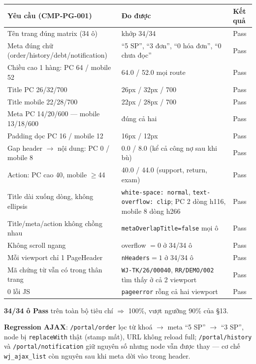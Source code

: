 \begin{longtable}{@{}p{7.4cm}p{4.3cm}p{2.6cm}@{}}
\toprule
\textbf{Yêu cầu (CMP-PG-001)} & \textbf{Đo được} & \textbf{Kết quả} \\
\midrule
\endhead
Tên trang đúng matrix (34 ô) & khớp 34/34 & Pass \\
Meta đúng chữ (order/history/debt/notification) & ``5 SP'', ``3 đơn'', ``0 hóa đơn'', ``0 chưa đọc'' & Pass \\
Chiều cao 1 hàng: PC 64 / mobile 52 & 64.0 / 52.0 mọi route & Pass \\
Title PC 26/32/700 & 26px / 32px / 700 & Pass \\
Title mobile 22/28/700 & 22px / 28px / 700 & Pass \\
Meta PC 14/20/600 --- mobile 13/18/600 & đúng cả hai & Pass \\
Padding dọc PC 16 / mobile 12 & 16px / 12px & Pass \\
Gap header $\to$ nội dung: PC 0 / mobile 8 & 0.0 / 8.0 (kể cả công nợ sau khi bù) & Pass \\
Action: PC cao 40, mobile $\ge$44 & 40.0 / 44.0 (support, return, exam) & Pass \\
Title dài xuống dòng, không ellipsis & \texttt{white-space: normal}, \texttt{text-overflow: clip}; PC 2 dòng h116, mobile 8 dòng h266 & Pass \\
Title/meta/action không chồng nhau & \texttt{metaOverlapTitle=false} mọi ô & Pass \\
Không scroll ngang & overflow $=0$ ở 34/34 ô & Pass \\
Mỗi viewport chỉ 1 PageHeader & \texttt{nHeaders}$=1$ ở 34/34 ô & Pass \\
Mã chứng từ vẫn có trong thân trang & \texttt{WJ-TK/26/00040}, \texttt{RR/DEMO/002} tìm thấy ở cả 2 viewport & Pass \\
0 lỗi JS & \texttt{pageerror} rỗng cả hai viewport & Pass \\
\bottomrule
\end{longtable}

\textbf{34/34 ô Pass} trên toàn bộ tiêu chí $\Rightarrow$ 100\%, vượt ngưỡng 90\% của §13.

\textbf{Regression AJAX}: \texttt{/portal/order} lọc từ khoá $\to$ meta ``5 SP'' $\to$ ``3 SP'',
node bị \texttt{replaceWith} thật (stamp mất), URL không reload full; \texttt{/portal/history}
và \texttt{/portal/notification} giữ nguyên số nhưng node vẫn được thay --- cơ chế
\texttt{wj\_ajax\_list} còn nguyên sau khi meta dời vào trong header.

